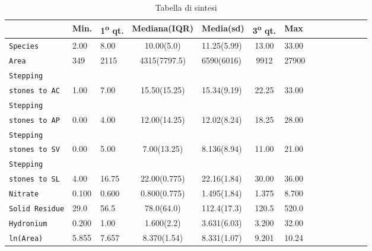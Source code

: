 \documentclass{article} %
\begin{document}
\begin{table}[H]
    \centering
    \renewcommand{\arraystretch}{1.4} %
    \begin{tabularx}{\textwidth}{p{69pt}l p{30pt}c p{45pt}c p{35pt}c p{40pt}c p{30pt}c p{27pt}r}
        \toprule
        & Min. & 1\textsuperscript{o} qt. & Mediana(IQR) & Media(sd) & 3\textsuperscript{o} qt. & Max\\
            \midrule  
            \texttt{Species} & 2.00 & 8.00 & 10.00(5.0) & 11.25(5.99) & 13.00 & 33.00 \\
            \texttt{Area} & 349 & 2115 & 4315(7797.5) & 6590(6016) & 9912 & 27900 \\
            \texttt{Stepping}\\ \texttt{stones to AC} & 1.00 & 7.00 & 15.50(15.25) & 15.34(9.19) & 22.25 & 33.00 \\
            \texttt{Stepping }\\
            \texttt{stones to AP} & 0.00 & 4.00 & 12.00(14.25) & 12.02(8.24) & 18.25 & 28.00 \\
            \texttt{Stepping }\\
            \texttt{stones to SV} & 0.00 & 5.00 & 7.00(13.25) & 8.136(8.94) & 11.00 & 21.00 \\
            \texttt{Stepping }\\
            \texttt{stones to SL} & 4.00 & 16.75 & 22.00(0.775) & 22.16(1.84) & 30.00 & 36.00 \\
            \texttt{Nitrate} & 0.100 & 0.600 & 0.800(0.775) & 1.495(1.84) & 1.375 & 8.700 \\
            \texttt{Solid Residue} & 29.0 & 56.5 & 78.0(64.0) & 112.4(17.3) & 120.5 & 520.0 \\
            \texttt{Hydronium} & 0.200 & 1.00 & 1.600(2.2) & 3.631(6.03) & 3.200 & 32.00 \\
            \texttt{ln(Area)} & 5.855 & 7.657 & 8.370(1.54) & 8.331(1.07) & 9.201 & 10.24 \\
        \bottomrule
    \end{tabularx}
    \caption{Tabella di sintesi}
\end{table}


\end{document}
